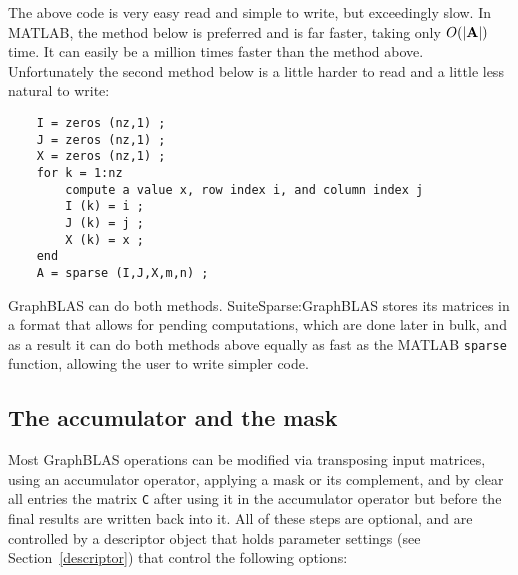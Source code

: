 \documentclass[12pt]{article}
\begin{document}
The above code is very easy read and simple to write, but exceedingly slow.  In
MATLAB, the method below is preferred and is far faster, taking only $O(|{\bf
A}|)$ time.  It can easily be a million times faster than the method above.
Unfortunately the second method below is a little harder to read and a little
less natural to write:

    \begin{mdframed}
    {\footnotesize
    \begin{verbatim}
    I = zeros (nz,1) ;
    J = zeros (nz,1) ;
    X = zeros (nz,1) ;
    for k = 1:nz
        compute a value x, row index i, and column index j
        I (k) = i ;
        J (k) = j ;
        X (k) = x ;
    end
    A = sparse (I,J,X,m,n) ;   \end{verbatim}} \end{mdframed}

GraphBLAS can do both methods.  SuiteSparse:GraphBLAS stores its matrices in a
format that allows for pending computations, which are done later in bulk, and
as a result it can do both methods above equally as fast as the MATLAB
\verb'sparse' function, allowing the user to write simpler code.

\subsection{The accumulator and the mask} %
\label{accummask}

Most GraphBLAS operations can be modified via transposing input matrices, using
an accumulator operator, applying a mask or its complement, and by clear all
entries the matrix \verb'C' after using it in the accumulator operator but
before the final results are written back into it.  All of these steps are
optional, and are controlled by a descriptor object that holds parameter
settings (see Section~\ref{descriptor}) that control the following options:
\end{document}
